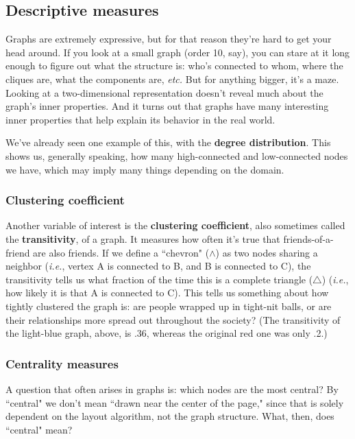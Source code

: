 \documentclass[12pt]{article}
\begin{document}
\subsection{Descriptive measures}

Graphs are extremely expressive, but for that reason they're hard to get your
head around. If you look at a small graph (order 10, say), you can stare at it
long enough to figure out what the structure is: who's connected to whom,
where the cliques are, what the components are, \textit{etc.} But for anything
bigger, it's a maze. Looking at a two-dimensional representation doesn't
reveal much about the graph's inner properties. And it turns out that graphs
have many interesting inner properties that help explain its behavior in the
real world.

We've already seen one example of this, with the \textbf{degree distribution}.
This shows us, generally speaking, how many high-connected and low-connected
nodes we have, which may imply many things depending on the domain.

\subsubsection{Clustering coefficient}

Another variable of interest is the \textbf{clustering coefficient}, also
sometimes called the \textbf{transitivity}, of a graph. It measures how often
it's true that friends-of-a-friend are also friends. If we define a ``chevron"
($\wedge$) as two nodes sharing a neighbor (\textit{i.e.}, vertex A is
connected to B, and B is connected to C), the transitivity tells us what
fraction of the time this is a complete triangle ($\triangle$) (\textit{i.e.},
how likely it is that A is connected to C). This tells us something about how
tightly clustered the graph is: are people wrapped up in tight-nit balls, or
are their relationships more spread out throughout the society? (The
transitivity of the light-blue graph, above, is .36, whereas the original red
one was only .2.)

\subsubsection{Centrality measures}

A question that often arises in graphs is: which nodes are the most central?
By ``central" we don't mean ``drawn near the center of the page," since that
is solely dependent on the layout algorithm, not the graph structure. What,
then, does ``central" mean?
\end{document}
